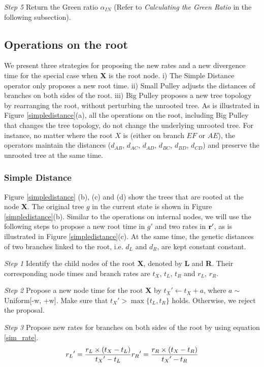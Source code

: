 \documentclass{bmcart}
\begin{document}
\emph{Step 5} Return the Green ratio ${\alpha_{IN}}$ (Refer to \textit{Calculating the Green Ratio} in the following subsection).

\subsection*{Operations on the root}
We present three strategies for proposing the new rates and a new divergence time for the special case when \textbf{X} is the root node. i) The Simple Distance operator only proposes a new root time. ii) Small Pulley adjusts the distances of branches on both sides of the root. iii) Big Pulley proposes a new tree topology by rearranging the root, without perturbing the unrooted tree. As is illustrated in Figure \ref{simpledistance}(a), all the operations on the root, including Big Pulley that changes the tree topology, do not change the underlying unrooted tree. For instance, no matter where the root $X$ is (either on branch $EF$ or $AE$), the operators maintain the distances ($d_{AB}$, $d_{AC}$, $d_{AD}$, $d_{BC}$, $d_{BD}$, $d_{CD}$) and preserve the unrooted tree at the same time.

\subsubsection*{Simple Distance}
Figure \ref{simpledistance} (b), (c) and (d) show the trees that are rooted at the node \textbf{X}. The original tree $g$ in the current state is shown in Figure \ref{simpledistance}(b). Similar to the operations on internal nodes, we will use the following steps to propose a new root time in ${g}'$ and two rates in $\bf{r}'$, as is illustrated in Figure \ref{simpledistance}(c). At the same time, the genetic distances of two branches linked to the root, i.e. $d_L$ and $d_R$, are kept constant constant.

\emph{Step 1} Identify the child nodes of the root \textbf{X}, denoted by \textbf{L} and \textbf{R}. Their corresponding node times and branch rates are $t_X$, $t_L$, $t_R$ and $r_L$, $r_R$.

\emph{Step 2} Propose a new node time for the root \textbf{X} by ${t_X}' \leftarrow {t_X} + a$, where $a \sim$ Uniform[-w, +w]. Make sure that ${t_X}' > \max \{ {t_L}, {t_R}\} $ holds. Otherwise, we reject the proposal.

\emph{Step 3} Propose new rates for branches on both sides of the root by using equation \ref{sim_rate}.
\begin{equation}
\label{sim_rate}
{r_L}' = \frac{{{r_L} \times ({{t_X} - {t_L}})}}{{{t_X}' - {t_L}}}\\
{r_R}' = \frac{{{r_R} \times ({{t_X} - {t_R}})}}{{{t_X}' - {t_R}}}
 \end{equation}
\end{document}
